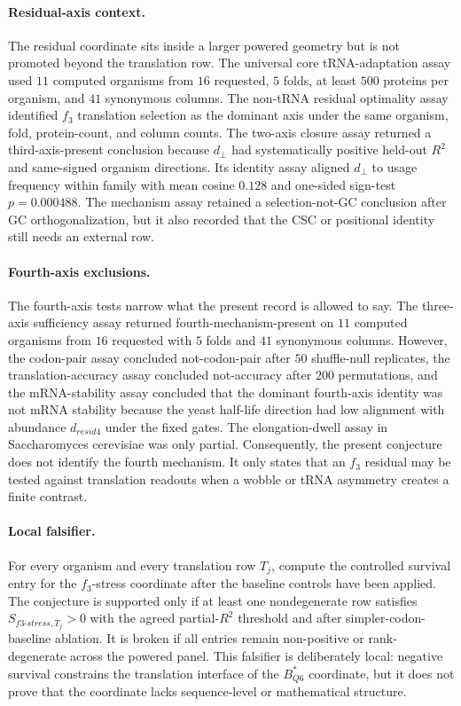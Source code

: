 \paragraph{Residual-axis context.}
The residual coordinate sits inside a larger powered geometry but is not promoted beyond the translation row.  The universal core tRNA-adaptation assay used $11$ computed organisms from $16$ requested, $5$ folds, at least $500$ proteins per organism, and $41$ synonymous columns.  The non-tRNA residual optimality assay identified $f_3$ translation selection as the dominant axis under the same organism, fold, protein-count, and column counts.  The two-axis closure assay returned a third-axis-present conclusion because $d_\perp$ had systematically positive held-out $R^2$ and same-signed organism directions.  Its identity assay aligned $d_\perp$ to usage frequency within family with mean cosine $0.128$ and one-sided sign-test $p=0.000488$.  The mechanism assay retained a selection-not-GC conclusion after GC orthogonalization, but it also recorded that the CSC or positional identity still needs an external row.

\paragraph{Fourth-axis exclusions.}
The fourth-axis tests narrow what the present record is allowed to say.  The three-axis sufficiency assay returned fourth-mechanism-present on $11$ computed organisms from $16$ requested with $5$ folds and $41$ synonymous columns.  However, the codon-pair assay concluded not-codon-pair after $50$ shuffle-null replicates, the translation-accuracy assay concluded not-accuracy after $200$ permutations, and the mRNA-stability assay concluded that the dominant fourth-axis identity was not mRNA stability because the yeast half-life direction had low alignment with abundance $d_{resid4}$ under the fixed gates.  The elongation-dwell assay in Saccharomyces cerevisiae was only partial.  Consequently, the present conjecture does not identify the fourth mechanism.  It only states that an $f_3$ residual may be tested against translation readouts when a wobble or tRNA asymmetry creates a finite contrast.

\paragraph{Local falsifier.}
For every organism and every translation row $T_j$, compute the controlled survival entry for the $f_3$-stress coordinate after the baseline controls have been applied.  The conjecture is supported only if at least one nondegenerate row satisfies $S_{f3\text{-}stress,T_j}>0$ with the agreed partial-$R^2$ threshold and after simpler-codon-baseline ablation.  It is broken if all entries remain non-positive or rank-degenerate across the powered panel.  This falsifier is deliberately local: negative survival constrains the translation interface of the $B^*_{Q6}$ coordinate, but it does not prove that the coordinate lacks sequence-level or mathematical structure.

